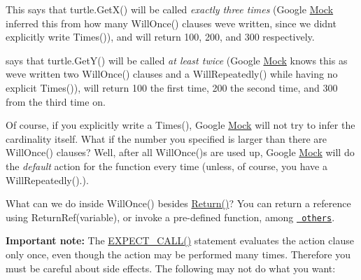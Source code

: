 This says that {\ttfamily turtle.\+Get\+X()} will be called {\itshape exactly three times} (Google \mbox{\hyperlink{classMock}{Mock}} inferred this from how many {\ttfamily Will\+Once()} clauses we\textquotesingle{}ve written, since we didn\textquotesingle{}t explicitly write {\ttfamily Times()}), and will return 100, 200, and 300 respectively.


\begin{DoxyCode}{0}
\end{DoxyCode}


says that {\ttfamily turtle.\+Get\+Y()} will be called {\itshape at least twice} (Google \mbox{\hyperlink{classMock}{Mock}} knows this as we\textquotesingle{}ve written two {\ttfamily Will\+Once()} clauses and a {\ttfamily Will\+Repeatedly()} while having no explicit {\ttfamily Times()}), will return 100 the first time, 200 the second time, and 300 from the third time on.

Of course, if you explicitly write a {\ttfamily Times()}, Google \mbox{\hyperlink{classMock}{Mock}} will not try to infer the cardinality itself. What if the number you specified is larger than there are {\ttfamily Will\+Once()} clauses? Well, after all {\ttfamily Will\+Once()}s are used up, Google \mbox{\hyperlink{classMock}{Mock}} will do the {\itshape default} action for the function every time (unless, of course, you have a {\ttfamily Will\+Repeatedly()}.).

What can we do inside {\ttfamily Will\+Once()} besides {\ttfamily \mbox{\hyperlink{namespacetesting_af6d1c13e9376c77671e37545cd84359c}{Return()}}}? You can return a reference using {\ttfamily Return\+Ref(variable)}, or invoke a pre-\/defined function, among \href{CheatSheet.md\#actions}{\texttt{ others}}.

{\bfseries{Important note\+:}} The {\ttfamily \mbox{\hyperlink{gmock-spec-builders_8h_a535a6156de72c1a2e25a127e38ee5232}{E\+X\+P\+E\+C\+T\+\_\+\+C\+A\+L\+L()}}} statement evaluates the action clause only once, even though the action may be performed many times. Therefore you must be careful about side effects. The following may not do what you want\+:


\begin{DoxyCode}{0}
\end{DoxyCode}



